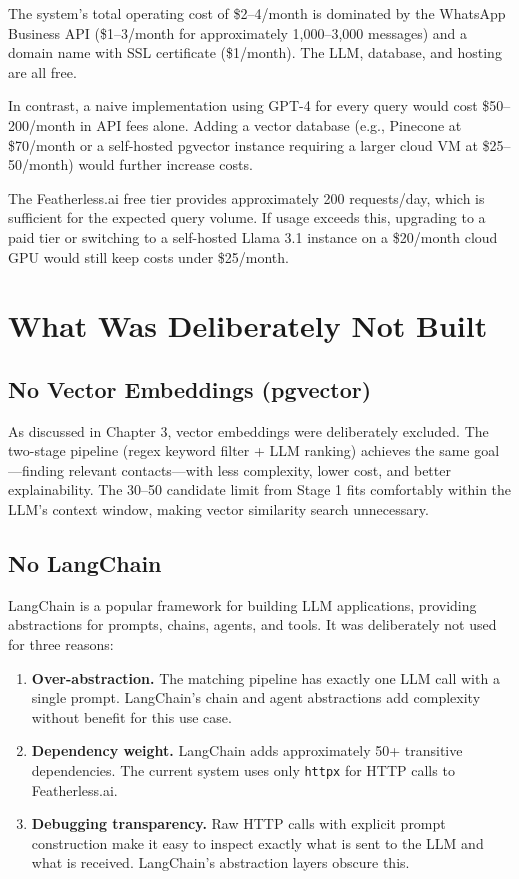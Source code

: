 \documentclass[12pt, a4paper]{report}
\begin{document}
The system's total operating cost of \$2--4/month is dominated by the WhatsApp Business API (\$1--3/month for approximately 1,000--3,000 messages) and a domain name with SSL certificate (\$1/month). The LLM, database, and hosting are all free.

In contrast, a naive implementation using GPT-4 for every query would cost \$50--200/month in API fees alone. Adding a vector database (e.g., Pinecone at \$70/month or a self-hosted pgvector instance requiring a larger cloud VM at \$25--50/month) would further increase costs.

The Featherless.ai free tier provides approximately 200 requests/day, which is sufficient for the expected query volume. If usage exceeds this, upgrading to a paid tier or switching to a self-hosted Llama 3.1 instance on a \$20/month cloud GPU would still keep costs under \$25/month.

\chapter{What Was Deliberately Not Built}

\section{No Vector Embeddings (pgvector)}

As discussed in Chapter 3, vector embeddings were deliberately excluded. The two-stage pipeline (regex keyword filter + LLM ranking) achieves the same goal---finding relevant contacts---with less complexity, lower cost, and better explainability. The 30--50 candidate limit from Stage 1 fits comfortably within the LLM's context window, making vector similarity search unnecessary.

\section{No LangChain}

LangChain is a popular framework for building LLM applications, providing abstractions for prompts, chains, agents, and tools. It was deliberately not used for three reasons:

\begin{enumerate}[itemsep=3pt]
    \item \textbf{Over-abstraction.} The matching pipeline has exactly one LLM call with a single prompt. LangChain's chain and agent abstractions add complexity without benefit for this use case.
    \item \textbf{Dependency weight.} LangChain adds approximately 50+ transitive dependencies. The current system uses only \texttt{httpx} for HTTP calls to Featherless.ai.
    \item \textbf{Debugging transparency.} Raw HTTP calls with explicit prompt construction make it easy to inspect exactly what is sent to the LLM and what is received. LangChain's abstraction layers obscure this.
\end{enumerate}
\end{document}
